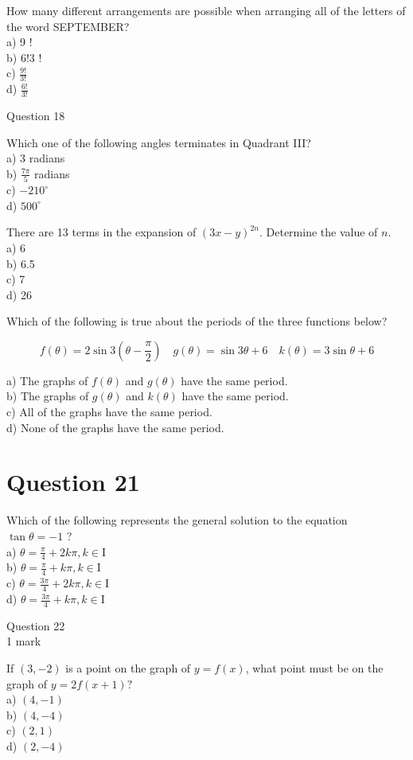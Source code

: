 \documentclass[10pt]{article}
\begin{document}
How many different arrangements are possible when arranging all of the letters of the word SEPTEMBER?\\
a) 9 !\\
b) $6!3$ !\\
c) $\frac{9!}{3!}$\\
d) $\frac{6!}{3!}$

Question 18

Which one of the following angles terminates in Quadrant III?\\
a) 3 radians\\
b) $\frac{7 \pi}{5}$ radians\\
c) $-210^{\circ}$\\
d) $500^{\circ}$

There are 13 terms in the expansion of $(3 x-y)^{2 n}$. Determine the value of $n$.\\
a) 6\\
b) 6.5\\
c) 7\\
d) 26

Which of the following is true about the periods of the three functions below?

$$
f(\theta)=2 \sin 3\left(\theta-\frac{\pi}{2}\right) \quad g(\theta)=\sin 3 \theta+6 \quad k(\theta)=3 \sin \theta+6
$$

a) The graphs of $f(\theta)$ and $g(\theta)$ have the same period.\\
b) The graphs of $g(\theta)$ and $k(\theta)$ have the same period.\\
c) All of the graphs have the same period.\\
d) None of the graphs have the same period.

\section*{Question 21}
Which of the following represents the general solution to the equation $\tan \theta=-1$ ?\\
a) $\theta=\frac{\pi}{4}+2 k \pi, k \in \mathrm{I}$\\
b) $\theta=\frac{\pi}{4}+k \pi, k \in \mathrm{I}$\\
c) $\theta=\frac{3 \pi}{4}+2 k \pi, k \in \mathrm{I}$\\
d) $\theta=\frac{3 \pi}{4}+k \pi, k \in \mathrm{I}$

Question 22\\
1 mark

If $(3,-2)$ is a point on the graph of $y=f(x)$, what point must be on the graph of $y=2 f(x+1) ?$\\
a) $(4,-1)$\\
b) $(4,-4)$\\
c) $(2,1)$\\
d) $(2,-4)$
\end{document}
